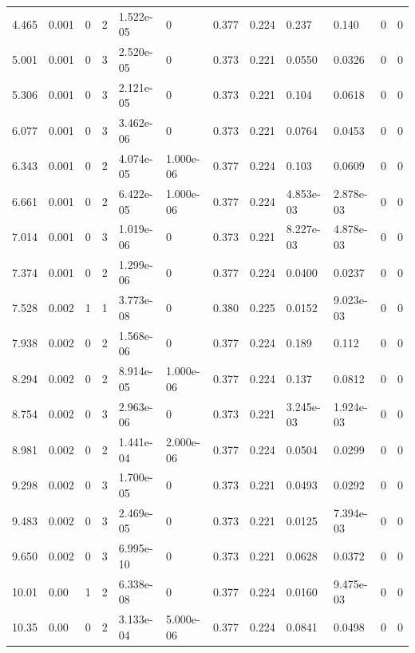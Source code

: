\documentclass[preview]{standalone}
\begin{document}
{{\begin{tabular}{L{1.2cm}C{1.2cm} C{0.3cm}C{0.5cm} C{1.4cm}C{1.4cm} C{1.4cm}C{1.4cm} C{1.6cm}C{1.6cm} C{1.6cm}C{1.6cm}}
  4.465  &  0.001  & 0     &  2 &  1.522e-05  & 0  &  0.377&   0.224& 0.237 & 0.140   &  0 & 0  \\ 
  5.001  &  0.001  & 0     &  3 &  2.520e-05  & 0  &  0.373&   0.221& 0.0550 & 0.0326   &  0 & 0  \\ 
  5.306  &  0.001  & 0     &  3 &  2.121e-05  & 0  &  0.373&   0.221& 0.104 & 0.0618   &  0 & 0  \\ 
  6.077  &  0.001  & 0     &  3 &  3.462e-06  & 0  &  0.373&   0.221& 0.0764 & 0.0453   &  0 & 0  \\ 
  6.343  &  0.001  & 0     &  2 &  4.074e-05  & 1.000e-06  &  0.377&   0.224& 0.103 & 0.0609   &  0 & 0  \\ 
  6.661  &  0.001  & 0     &  2 &  6.422e-05  & 1.000e-06  &  0.377&   0.224& 4.853e-03 & 2.878e-03   &  0 & 0  \\ 
  7.014  &  0.001  & 0     &  3 &  1.019e-06  & 0  &  0.373&   0.221& 8.227e-03 & 4.878e-03   &  0 & 0  \\ 
  7.374  &  0.001  & 0     &  2 &  1.299e-06  & 0  &  0.377&   0.224& 0.0400 & 0.0237   &  0 & 0  \\ 
  7.528  &  0.002  & 1     &  1 &  3.773e-08  & 0  &  0.380&   0.225& 0.0152 & 9.023e-03   &  0 & 0  \\ 
  7.938  &  0.002  & 0     &  2 &  1.568e-06  & 0  &  0.377&   0.224& 0.189 & 0.112   &  0 & 0  \\ 
  8.294  &  0.002  & 0     &  2 &  8.914e-05  & 1.000e-06  &  0.377&   0.224& 0.137 & 0.0812   &  0 & 0  \\ 
  8.754  &  0.002  & 0     &  3 &  2.963e-06  & 0  &  0.373&   0.221& 3.245e-03 & 1.924e-03   &  0 & 0  \\ 
  8.981  &  0.002  & 0     &  2 &  1.441e-04  & 2.000e-06  &  0.377&   0.224& 0.0504 & 0.0299   &  0 & 0  \\ 
  9.298  &  0.002  & 0     &  3 &  1.700e-05  & 0  &  0.373&   0.221& 0.0493 & 0.0292   &  0 & 0  \\ 
  9.483  &  0.002  & 0     &  3 &  2.469e-05  & 0  &  0.373&   0.221& 0.0125 & 7.394e-03   &  0 & 0  \\ 
  9.650  &  0.002  & 0     &  3 &  6.995e-10  & 0  &  0.373&   0.221& 0.0628 & 0.0372   &  0 & 0  \\ 
  10.01  &  0.00  & 1     &  2 &  6.338e-08  & 0  &  0.377&   0.224& 0.0160 & 9.475e-03   &  0 & 0  \\ 
  10.35  &  0.00  & 0     &  2 &  3.133e-04  & 5.000e-06  &  0.377&   0.224& 0.0841 & 0.0498   &  0 & 0  \\ 

\end{tabular}}}
\end{document}
